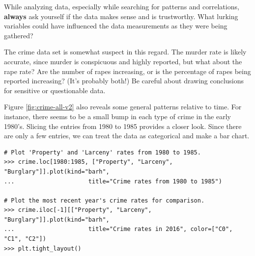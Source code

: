 \begin{warn}
While analyzing data, especially while searching for patterns and correlations, \textbf{always} ask yourself if the data makes sense and is trustworthy.
What lurking variables could have influenced the data measurements as they were being gathered?

The crime data set is somewhat suspect in this regard.
The murder rate is likely accurate, since murder is conspicuous and highly reported, but what about the rape rate?
Are the number of rapes increasing, or is the percentage of rapes being reported increasing? (It's probably both!)
Be careful about drawing conclusions for sensitive or questionable data.
\end{warn}

Figure \ref{fig:crime-all-v2} also reveals some general patterns relative to time.
For instance, there seems to be a small bump in each type of crime in the early 1980's.
Slicing the entries from 1980 to 1985 provides a closer look.
Since there are only a few entries, we can treat the data as categorical and make a bar chart.

\begin{lstlisting}
# Plot 'Property' and 'Larceny' rates from 1980 to 1985.
>>> crime.loc[1980:1985, ["Property", "Larceny", "Burglary"]].plot(kind="barh",
...                     title="Crime rates from 1980 to 1985")

# Plot the most recent year's crime rates for comparison.
>>> crime.iloc[-1][["Property", "Larceny", "Burglary"]].plot(kind="barh",
...                     title="Crime rates in 2016", color=["C0", "C1", "C2"])
>>> plt.tight_layout()
\end{lstlisting}

